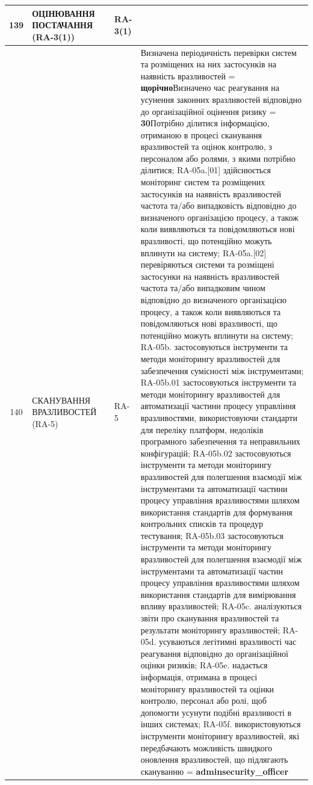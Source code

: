 \documentclass[10pt]{article}
\begin{document}
\begin{longtable}{|c|>{\raggedright\arraybackslash}p{2.5cm}|>{\raggedright\arraybackslash}p{4.5cm}|>{\raggedright\arraybackslash}p{3cm}|>{\raggedright\arraybackslash}p{4.5cm}|}
139 & ОЦІНЮВАННЯ ПОСТАЧАННЯ (RA-3(1)) &  & RA-3(1) &  \\ \hline
140 & СКАНУВАННЯ ВРАЗЛИВОСТЕЙ (RA-5) &  & RA-5 & Визначена періодичність перевірки систем та розміщених на них застосунків на наявність вразливостей = \textbf{щорічно}\newline Визначено час реагування на усунення законних вразливостей відповідно до організаційної оцінення ризику = \textbf{30}\newline Потрібно ділитися інформацією, отриманою в процесі сканування вразливостей та оцінок контролю, з персоналом або ролями, з якими потрібно ділитися; RA-05a.[01] здійснюється моніторинг систем та розміщених застосунків на наявність вразливостей частота та/або випадковість відповідно до визначеного організацією процесу, а також коли виявляються та повідомляються нові вразливості, що потенційно можуть вплинути на систему; RA-05a.[02] перевіряються системи та розміщені застосунки на наявність вразливостей частота та/або випадковим чином відповідно до визначеного організацією процесу, а також коли виявляються та повідомляються нові вразливості, що потенційно можуть вплинути на систему; RA-05b. застосовуються інструменти та методи моніторингу вразливостей для забезпечення сумісності між інструментами; RA-05b.01 застосовуються інструменти та методи моніторингу вразливостей для автоматизації частини процесу управління вразливостями, використовуючи стандарти для переліку платформ, недоліків програмного забезпечення та неправильних конфігурацій; RA-05b.02 застосовуються інструменти та методи моніторингу вразливостей для полегшення взаємодії між інструментами та автоматизації частини процесу управління вразливостями шляхом використання стандартів для формування контрольних списків та процедур тестування; RA-05b.03 застосовуються інструменти та методи моніторингу вразливостей для полегшення взаємодії між інструментами та автоматизації частин процесу управління вразливостями шляхом використання стандартів для вимірювання впливу вразливостей; RA-05c. аналізуються звіти про сканування вразливостей та результати моніторингу вразливостей; RA-05d. усуваються легітимні вразливості час реагування відповідно до організаційної оцінки ризиків; RA-05e. надається інформація, отримана в процесі моніторингу вразливостей та оцінки контролю, персонал або ролі, щоб допомогти усунути подібні вразливості в інших системах; RA-05f. використовуються інструменти моніторингу вразливостей, які передбачають можливість швидкого оновлення вразливостей, що підлягають скануванню = \textbf{adminsecurity\_\allowbreak{}officer} \\ \hline

\end{longtable}
\end{document}
